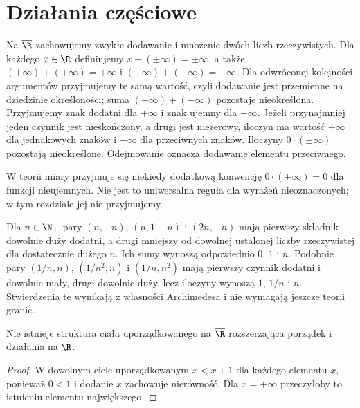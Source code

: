 \section{Działania częściowe}
\label{ma1:sec:extended-operations}
\begin{definicja}
\label{ma1:def:extended-operations}
Na $\overline{\R}$ zachowujemy zwykłe dodawanie i mnożenie dwóch liczb rzeczywistych. Dla każdego $x\in\R$ definiujemy $x+(\pm\infty)=\pm\infty$, a także $(+\infty)+(+\infty)=+\infty$ i $(-\infty)+(-\infty)=-\infty$. Dla odwróconej kolejności argumentów przyjmujemy tę samą wartość, czyli dodawanie jest przemienne na dziedzinie określoności; suma $(+\infty)+(-\infty)$ pozostaje nieokreślona.
Przyjmujemy znak dodatni dla $+\infty$ i znak ujemny dla $-\infty$. Jeżeli przynajmniej jeden czynnik jest nieskończony, a drugi jest niezerowy, iloczyn ma wartość $+\infty$ dla jednakowych znaków i $-\infty$ dla przeciwnych znaków. Iloczyny $0\cdot(\pm\infty)$ pozostają nieokreślone. Odejmowanie oznacza dodawanie elementu przeciwnego.
\end{definicja}
W teorii miary przyjmuje się niekiedy dodatkową konwencję $0\cdot(+\infty)=0$ dla funkcji nieujemnych. Nie jest to uniwersalna reguła dla wyrażeń nieoznaczonych; w tym rozdziale jej nie przyjmujemy.

\begin{przyklad}
Dla $n\in\N_+$ pary $(n,-n)$, $(n,1-n)$ i $(2n,-n)$ mają pierwszy składnik dowolnie duży dodatni, a drugi mniejszy od dowolnej ustalonej liczby rzeczywistej dla dostatecznie dużego $n$. Ich sumy wynoszą odpowiednio $0$, $1$ i $n$. Podobnie pary $(1/n,n)$, $(1/n^2,n)$ i $(1/n,n^2)$ mają pierwszy czynnik dodatni i dowolnie mały, drugi dowolnie duży, lecz iloczyny wynoszą $1$, $1/n$ i $n$. Stwierdzenia te wynikają z własności Archimedesa i nie wymagają jeszcze teorii granic.
\end{przyklad}
\begin{stwierdzenie}
\label{ma1:prop:extended-not-field}
Nie istnieje struktura ciała uporządkowanego na $\overline{\R}$ rozszerzająca porządek i działania na $\R$.
\end{stwierdzenie}
\begin{proof}
W dowolnym ciele uporządkowanym $x<x+1$ dla każdego elementu $x$, ponieważ $0<1$ i dodanie $x$ zachowuje nierówność. Dla $x=+\infty$ przeczyłoby to istnieniu elementu największego.
\end{proof}

